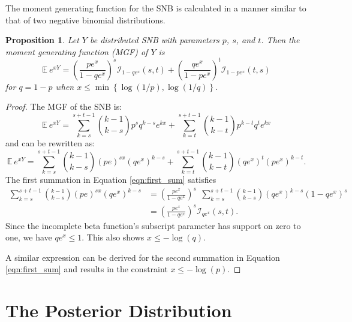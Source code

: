 \documentclass[review]{elsarticle}
\newtheorem{prop}{Proposition}
\begin{document}
The moment generating function for the SNB is calculated in a manner similar to 
that of two negative binomial distributions. 
\begin{prop} Let $Y$ be distributed SNB with parameters $p$, $s$, and $t$.
Then the moment generating function (MGF) of $Y$ is
\begin{equation} \label{eqn:mgf}
\mathbb{E}~e^{xY} = \left(\frac{p e^x}{1 - qe^x}\right)^s 
  \mathcal{I}_{1-qe^x} (s, t) + \left(\frac{qe^x}{1-pe^x}\right)^t 
  \mathcal{I}_{1-pe^x}(t, s)
\end{equation}
for $q = 1-p$ when $x \leq \min \left\{\log(1/p), \log(1/q) \right\}$.
\end{prop}
\begin{proof}
The MGF of the SNB is:
\begin{equation*}
\mathbb{E}~e^{xY} = \sum_{k=s}^{s+t-1} {k-1 \choose k-s} p^s q^{k-s} e^{kx} 
  + \sum_{k=t}^{s+t-1} {k-1 \choose k-t} p^{k-t} q^t e^{kx}
\end{equation*}
and can be rewritten as:
\begin{equation} \label{eqn:first_sum}
\mathbb{E}~e^{xY} = \sum_{k=s}^{s+t-1}{k-1 \choose k-s} (pe)^{sx} (qe^x)^{k-s} 
  + \sum_{k=t}^{s+t-1}{k-1 \choose k-t} (qe^x)^t (pe^x)^{k-t}.
\end{equation}
The first summation in Equation \ref{eqn:first_sum} satisfies
\begin{align*}
\sum_{k=s}^{s+t-1}{k-1 \choose k-s} (pe)^{sx} (qe^x)^{k-s} &= 
  \left(\frac{pe^x}{1 - qe^x}\right)^s \ \ \sum_{k=s}^{s+t-1} {k-1 \choose k-s} 
    (qe^x)^{k-s} (1-qe^x)^s \\
  &= \left(\frac{pe^x}{1 - qe^x}\right)^s \mathcal{I}_{qe^x}(s, t).
\end{align*}
Since the incomplete beta function's subscript parameter has support on zero 
to one, we have $qe^x \leq 1$. This also shows $x \leq -\log(q)$.

A similar expression can be derived for the second summation in 
Equation \ref{eqn:first_sum} and results in
the constraint $x \leq -\log(p)$.
\end{proof}

\section{The Posterior Distribution}
\end{document}
